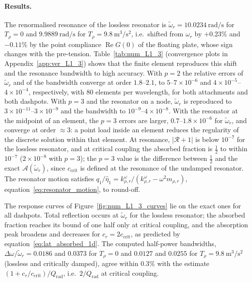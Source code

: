 {\paragraph{Results.} The renormalised resonance of the lossless resonator is $\widetilde{\omega}_r=10.0234~\si{\radian\per\second}$ for $T_\rho=0$ and $9.9889~\si{\radian\per\second}$ for $T_\rho=9.8~\si{\meter\cubed\per\second\squared}$, i.e.\ shifted from $\omega_r$ by $+0.23\%$ and $-0.11\%$ by the point compliance $\operatorname{Re}G(0)$ of the floating plate, whose sign changes with the pre-tension. Table~\ref{tab:num_L1_3} (convergence plots in Appendix~\ref{app:ver_L1_3}) shows that the finite element reproduces this shift and the resonance bandwidth to high accuracy. With $p=2$ the relative errors of $\widetilde{\omega}_r$ and of the bandwidth converge at order $1.8$--$2.1$, to $5$--$7\times10^{-6}$ and $4\times10^{-5}$--$4\times10^{-4}$, respectively, with $80$ elements per wavelength, for both attachments and both dashpots. With $p=3$ and the resonator on a node, $\widetilde{\omega}_r$ is reproduced to $3\times10^{-11}$--$3\times10^{-9}$ and the bandwidth to $10^{-9}$--$4\times10^{-8}$. With the resonator at the midpoint of an element, the $p=3$ errors are larger, $0.7$--$1.8\times10^{-6}$ for $\widetilde{\omega}_r$, and converge at order $\approx3$: a point load inside an element reduces the regularity of the discrete solution within that element. At resonance, $|\mathcal{R}+1|$ is below $10^{-7}$ for the lossless resonator, and at critical coupling the absorbed fraction is $\tfrac12$ to within $10^{-7}$ ($2\times10^{-8}$ with $p=3$); the $p=3$ value is the difference between $\tfrac12$ and the exact $\mathcal{A}(\widetilde{\omega}_r)$, since $c_\mathrm{crit}$ is defined at the resonance of the undamped resonator. The resonator motion satisfies $q_1/\widehat{\eta}_1=k_{\rho,r}^\omega/(k_{\rho,r}^\omega-\omega^2m_{\rho,r})$, equation~\eqref{eq:resonator_motion}, to round-off.

The response curves of Figure~\ref{fig:num_L1_3_curves} lie on the exact ones for all dashpots. Total reflection occurs at $\widetilde{\omega}_r$ for the lossless resonator; the absorbed fraction reaches its bound of one half only at critical coupling, and the absorption peak broadens and decreases for $c_r=2c_\mathrm{crit}$, as predicted by equation~\eqref{eq:lat_absorbed_1d}. The computed half-power bandwidths, $\Delta\omega/\widetilde{\omega}_r=0.0186$ and $0.0373$ for $T_\rho=0$ and $0.0127$ and $0.0255$ for $T_\rho=9.8~\si{\meter\cubed\per\second\squared}$ (lossless and critically damped), agree within $0.3\%$ with the estimate $(1+c_r/c_\mathrm{crit})/Q_\mathrm{rad}$, i.e.\ $2/Q_\mathrm{rad}$ at critical coupling.

}
